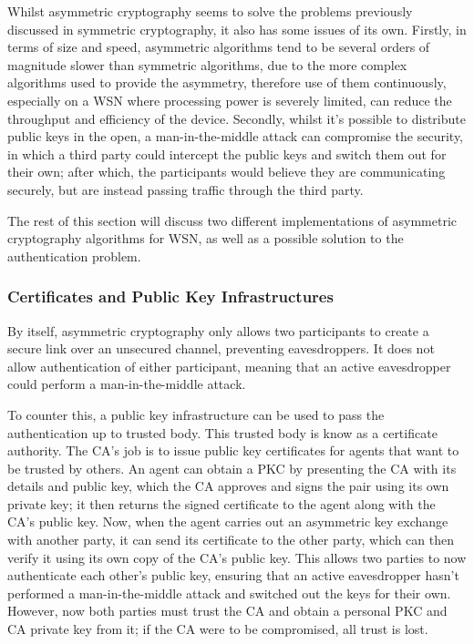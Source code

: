 \documentclass{mprop}
\begin{document}
Whilst asymmetric cryptography seems to solve the problems previously discussed in symmetric cryptography, it also has some issues of its own. Firstly, in terms of size and speed, asymmetric algorithms tend to be several orders of magnitude slower than symmetric algorithms, due to the more complex algorithms used to provide the asymmetry, therefore use of them continuously, especially on a WSN where processing power is severely limited, can reduce the throughput and efficiency of the device.
Secondly, whilst it's possible to distribute public keys in the open, a man-in-the-middle attack can compromise the security, in which a third party could intercept the public keys and switch them out for their own; after which, the participants would believe they are communicating securely, but are instead passing traffic through the third party.

The rest of this section will discuss two different implementations of asymmetric cryptography algorithms for WSN, as well as a possible solution to the authentication problem.

\subsubsection{Certificates and Public Key Infrastructures} %
\label{ssub:certificates_and_public_key_infrastructures}
By itself, asymmetric cryptography only allows two participants to create a secure link over an unsecured channel, preventing eavesdroppers. It does not allow authentication of either participant, meaning that an active eavesdropper could perform a man-in-the-middle attack. 

To counter this, a public key infrastructure can be used to pass the authentication up to trusted body. This trusted body is know as a certificate authority. The CA's job is to issue public key certificates for agents that want to be trusted by others. An agent can obtain a PKC by presenting the CA with its details and public key, which the CA approves and signs the pair using its own private key; it then returns the signed certificate to the agent along with the CA's public key. Now, when the agent carries out an asymmetric key exchange with another party, it can send its certificate to the other party, which can then verify it using its own copy of the CA's public key. This allows two parties to now authenticate each other's public key, ensuring that an active eavesdropper hasn't performed a man-in-the-middle attack and switched out the keys for their own. However, now both parties must trust the CA and obtain a personal PKC and CA private key from it; if the CA were to be compromised, all trust is lost.
\end{document}
